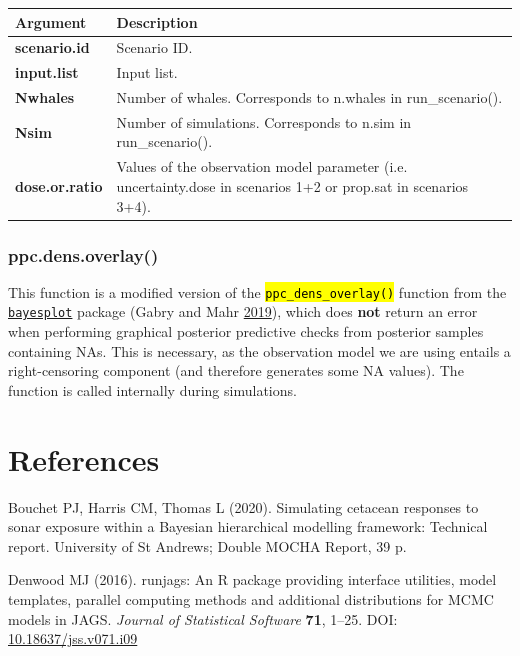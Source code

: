 \documentclass[
]{article}
\begin{document}
\renewcommand{\arraystretch}{1.4}
\begin{table}[H]
\centering
\begin{tabular}{>{\bfseries}l|>{\raggedright\arraybackslash}p{30em}}
\toprule
\textbf{Argument} & \textbf{Description}\\
\midrule
scenario.id & Scenario ID.\\
input.list & Input list.\\
Nwhales & Number of whales. Corresponds to n.whales in run\_scenario().\\
Nsim & Number of simulations. Corresponds to n.sim in run\_scenario().\\
dose.or.ratio & Values of the observation model parameter (i.e. uncertainty.dose in scenarios 1+2 or prop.sat in scenarios 3+4).\\
\bottomrule
\end{tabular}
\end{table}

\subsubsection{ppc.dens.overlay()}

This function is a modified version of the \textcolor{codecolor}{\texttt{\hl{ppc\_dens\_overlay()}}} function from the \href{https://cran.r-project.org/web/packages/bayesplot/index.html}{\texttt{bayesplot}} package (Gabry and Mahr \protect\hyperlink{ref-Gabry2019}{2019}), which does \textbf{not} return an error when performing graphical posterior predictive checks from posterior samples containing NAs. This is necessary, as the observation model we are using entails a right-censoring component (and therefore generates some NA values). The function is called internally during simulations.

\newpage
\section{References}

\hypertarget{refs}{}
\leavevmode\hypertarget{ref-Bouchet2020a}{}%
Bouchet PJ, Harris CM, Thomas L (2020). Simulating cetacean responses to sonar exposure within a Bayesian hierarchical modelling framework: Technical report. University of St Andrews; Double MOCHA Report, 39 p.

\leavevmode\hypertarget{ref-Denwood2016}{}%
Denwood MJ (2016). runjags: An R package providing interface utilities, model templates, parallel computing methods and additional distributions for MCMC models in JAGS. \emph{Journal of Statistical Software} \textbf{71}, 1--25. DOI: \href{https://doi.org/10.18637/jss.v071.i09}{10.18637/jss.v071.i09}
\end{document}
